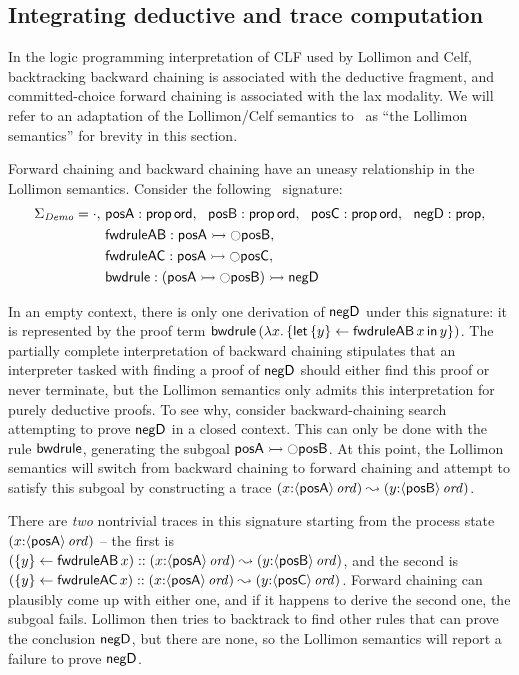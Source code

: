 \subsection{Integrating deductive and trace computation}

In the logic programming interpretation of CLF used by Lollimon and
Celf, backtracking backward chaining is associated with the deductive
fragment, and committed-choice forward chaining is associated with the
lax modality. We will refer to an adaptation of the Lollimon/Celf
semantics to \sls~as ``the Lollimon semantics'' for
brevity in this section.

Forward chaining and backward chaining have an uneasy relationship in
the Lollimon semantics. Consider the following \sls~signature:
\begin{align*}
 \Sigma_{\it Demo} = \cdot, 
~&{\sf posA} : {\sf prop}\,{\sf ord}, 
~~{\sf posB} : {\sf prop}\,{\sf ord}, 
~~{\sf posC} : {\sf prop}\,{\sf ord}, 
~~{\sf negD} : {\sf prop},\\
~&{\sf fwdruleAB} : {\sf posA} \rightarrowtail {\ocircle}{\sf posB},\\
~&{\sf fwdruleAC} : {\sf posA} \rightarrowtail {\ocircle}{\sf posC},\\
~&{\sf bwdrule} : ({\sf posA} \rightarrowtail {\ocircle}{\sf posB}) \rightarrowtail {\sf negD}
\end{align*}

In an empty context, there is only one derivation of ${\sf negD}$
under this signature: it is represented by the proof term ${\sf
  bwdrule}\,(\lambda x.\,\{{\sf let}\,{\{{y}\} \leftarrow {{\sf
      fwdruleAB}\,x}}\,{\sf in}\, {y} \})$. The partially complete interpretation of
backward chaining stipulates that an interpreter tasked with finding a
proof of ${\sf negD}$ should either find this proof or never
terminate, but the Lollimon semantics only admits this interpretation for purely
deductive proofs. To see why, consider backward-chaining search
attempting to prove ${\sf negD}$ in a closed context.  This can only
be done with the rule ${\sf bwdrule}$, generating the subgoal ${\sf
  posA} \rightarrowtail {\ocircle}{\sf posB}$.  At this point, the Lollimon semantics 
will switch
from backward chaining to forward chaining and attempt to satisfy this
subgoal by constructing a trace $(x{:}{\langle {\sf posA} \rangle}\,{{\it ord}})
\leadsto (y{:}{\langle {\sf posB} \rangle}\,{{\it ord}})$.

There are {\it two} nontrivial traces in this signature starting from
the process state $(x{:}{\langle {\sf posA} \rangle}\,{{\it ord}})$ -- the first is
$(\{{y}\} \leftarrow {{\sf fwdruleAB}\,x}) :: (x{:}{\langle {\sf posA} \rangle}\,{{\it ord}})
\leadsto (y{:}{\langle {\sf posB} \rangle}\,{{\it ord}})$, and the second is
$(\{{y}\} \leftarrow {{\sf fwdruleAC}\,x})::(x{:}{\langle {\sf posA} \rangle}\,{{\it ord}})
\leadsto (y{:}{\langle {\sf posC} \rangle}\,{{\it ord}})$.  Forward chaining can
plausibly come up with either one, and if it happens to derive the
second one, the subgoal fails. Lollimon
then tries to backtrack to find
other rules that can prove the conclusion ${\sf negD}$, but there are
none, so the Lollimon semantics will report a failure to prove ${\sf negD}$.

